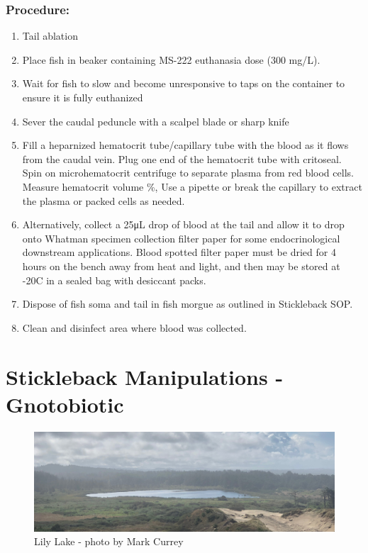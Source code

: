 \documentclass[
]{book}
\providecommand{\tightlist}{%
  \setlength{\itemsep}{0pt}\setlength{\parskip}{0pt}}
\begin{document}
\hypertarget{procedure-15}{%
\subsection{Procedure:}\label{procedure-15}}

\begin{enumerate}
\def\labelenumi{\arabic{enumi}.}
\tightlist
\item
  Tail ablation
\item
  Place fish in beaker containing MS-222 euthanasia dose (300 mg/L).
\item
  Wait for fish to slow and become unresponsive to taps on the container to ensure it is fully euthanized
\item
  Sever the caudal peduncle with a scalpel blade or sharp knife
\item
  Fill a heparnized hematocrit tube/capillary tube with the blood as it flows from the caudal vein. Plug one end of the hematocrit tube with critoseal. Spin on microhematocrit centrifuge to separate plasma from red blood cells. Measure hematocrit volume \%, Use a pipette or break the capillary to extract the plasma or packed cells as needed.
\item
  Alternatively, collect a 25μL drop of blood at the tail and allow it to drop onto Whatman specimen collection filter paper for some endocrinological downstream applications. Blood spotted filter paper must be dried for 4 hours on the bench away from heat and light, and then may be stored at -20C in a sealed bag with desiccant packs.
\item
  Dispose of fish soma and tail in fish morgue as outlined in Stickleback SOP.
\item
  Clean and disinfect area where blood was collected.
\end{enumerate}

\hypertarget{stickleback-manipulations---gnotobiotic}{%
\chapter{Stickleback Manipulations - Gnotobiotic}\label{stickleback-manipulations---gnotobiotic}}

\begin{figure}
\centering
\includegraphics{images/lily_lake_header.jpg}
\caption{Lily Lake - photo by Mark Currey}
\end{figure}
\end{document}
